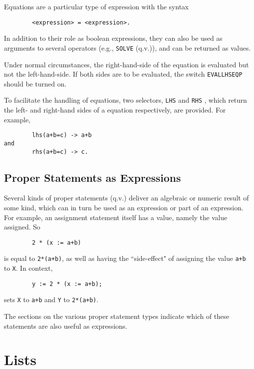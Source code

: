 Equations are a particular type of expression with the syntax

\begin{verbatim}
        <expression> = <expression>.
\end{verbatim}

In addition to their role as boolean expressions, they can also be used as
arguments to several operators (e.g., {\tt SOLVE} (q.v.)), and can be
returned as values.

Under normal circumstances, the right-hand-side of the equation is evaluated
but not the left-hand-side.  If both sides are to be evaluated, the switch
{\tt EVALLHSEQP}  should be turned on.

To facilitate the handling of equations, two selectors, {\tt LHS}
 and {\tt RHS} , which return the left- and
right-hand sides of a equation respectively, are provided.
For example,
\begin{verbatim}
        lhs(a+b=c) -> a+b
and
        rhs(a+b=c) -> c.
\end{verbatim}

\section{Proper Statements as Expressions}

Several kinds of proper statements (q.v.) deliver
an algebraic or numeric result of some kind, which can in turn be used as
an expression or part of an expression.  For example, an assignment
statement itself has a value, namely the value assigned.  So
\begin{verbatim}
        2 * (x := a+b)
\end{verbatim}
is equal to {\tt 2*(a+b)}, as well as having the ``side-effect" of assigning the value {\tt a+b} to {\tt X}.  In context,
\begin{verbatim}
        y := 2 * (x := a+b);
\end{verbatim}
sets {\tt X} to {\tt a+b} and {\tt Y} to {\tt 2*(a+b)}.

The sections on the various proper statement types
indicate which of these statements are also useful as expressions.

\chapter{Lists}

